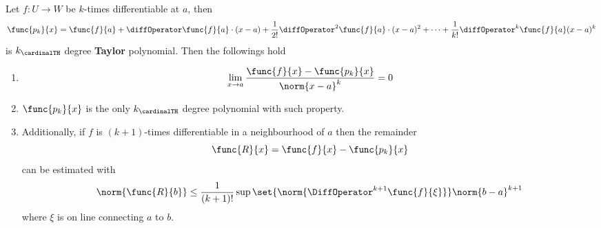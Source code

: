 \begin{theorem}
    Let \(f : U \to W\) be \(k\)-times differentiable at \(a\), then
    \begin{equation*}
        \func{p_k}{x} = \func{f}{a} + \diffOperator \func{f}{a} \cdot (x-a) + \dfrac{1}{2!} \diffOperator^2 \func{f}{a} \cdot (x-a)^2 + \dots + \dfrac{1}{k!} \diffOperator^k \func{f}{a} (x-a)^k
    \end{equation*}
    is \(k_\cardinalTH\) degree \textbf{Taylor} polynomial. Then the followings hold
    \begin{enumerate}
        \item
              \begin{equation*}
                  \lim_{x \to a} \dfrac{\func{f}{x} - \func{p_k}{x}}{\norm{x-a}^{k}} = 0
              \end{equation*}
        \item \(\func{p_k}{x}\) is the only \(k_\cardinalTH\) degree polynomial with such property.
        \item Additionally, if \(f\) is \((k + 1)\)-times differentiable in a neighbourhood of \(a\) then the remainder
              \begin{equation*}
                  \func{R}{x} = \func{f}{x} - \func{p_k}{x}
              \end{equation*}
              can be estimated with
              \begin{equation*}
                  \norm{\func{R}{b}} \leq \dfrac{1}{(k+1)!} \sup \set{\norm {\DiffOperator^{k+1} \func{f}{\xi}}} \norm{b-a}^{k+1}
              \end{equation*}
              where \(\xi\) is on line connecting \(a\) to \(b\).
    \end{enumerate}
\end{theorem}

